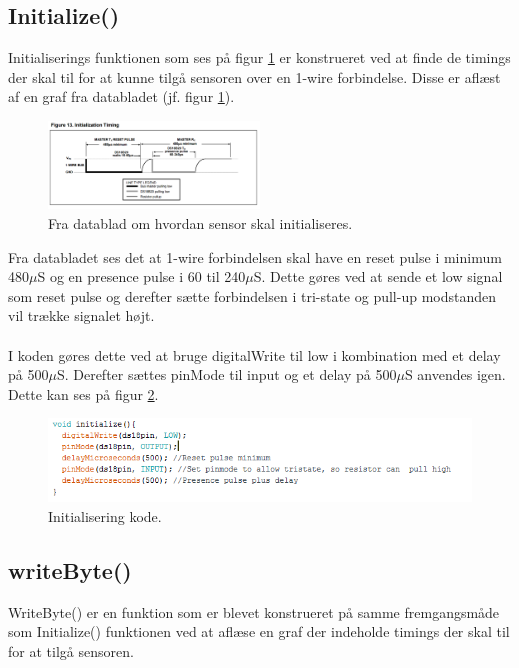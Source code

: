 \subsection{Initialize()}
Initialiserings funktionen som ses på figur \ref{sensor_kom} er konstrueret ved at finde de timings der skal til for at kunne tilgå sensoren over en 1-wire forbindelse. Disse er aflæst af en graf fra databladet (jf. figur \ref{sensor_kom}).




\begin{figure}[h!]
  \centering
  \includegraphics[width=0.5\textwidth]{figures/Initialization_timing.png}
  \caption{Fra datablad om hvordan sensor skal initialiseres.}
  \label{sensor_kom}
\end{figure}

Fra databladet ses det at 1-wire forbindelsen skal have en reset pulse i minimum 480$\mu$S og en presence pulse i 60 til 240$\mu$S. Dette gøres ved at sende et low signal som reset pulse og derefter sætte forbindelsen i tri-state og pull-up modstanden vil trække signalet højt. 
\\
\\
I koden gøres dette ved at bruge digitalWrite til low i kombination med et delay på 500$\mu$S. Derefter sættes pinMode til input og et delay på 500$\mu$S anvendes igen. Dette kan ses på figur \ref{sensor_kode}.

\begin{figure}[h!]
  \centering
  \includegraphics[width=1\textwidth]{figures/Init.png}
  \caption{Initialisering kode.}
  \label{sensor_kode}
\end{figure}


\subsection{writeByte()}
WriteByte() er en funktion som er blevet konstrueret på samme fremgangsmåde som Initialize() funktionen ved at aflæse en graf der indeholde timings der skal til for at tilgå sensoren.

